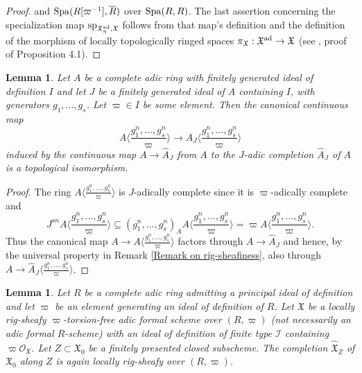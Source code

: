 \documentclass[12pt,twoside,a4paper]{article}
\newtheorem{lemma}[thm]{Lemma}
\theoremstyle{definition}
\theoremstyle{remark}
\newcommand\ad{{\rm ad}}
\newcommand\spc{{\rm sp}}
\newcommand\Spa{{\rm Spa}}
\begin{document}
\begin{proof}
and $\Spa(R[\varpi^{-1}], \overline{R})$ over $\Spa(R, R)$. The last assertion concerning the specialization map $\spc_{\mathfrak{X}_{\eta}^{\ad},\mathfrak{X}}$ follows from that map's definition and the definition of the morphism of locally topologically ringed spaces $\pi_{\mathfrak{X}}: \mathfrak{X}^{\ad}\to \mathfrak{X}$ (see \cite{Huber2}, proof of Proposition 4.1).\end{proof}
\begin{lemma}\label{Completion along an ideal}Let $A$ be a complete adic ring with finitely generated ideal of definition $I$ and let $J$ be a finitely generated ideal of $A$ containing $I$, with generators $g_1,\dots,g_s$. Let $\varpi\in I$ be some element. Then the canonical continuous map \begin{equation*}A\langle\frac{g_1^{n},\dots,g_s^{n}}{\varpi}\rangle\to \widehat{A}_{J}\langle\frac{g_1^{n},\dots,g_s^{n}}{\varpi}\rangle\end{equation*}induced by the continuous map $A\to \widehat{A}_{J}$ from $A$ to the $J$-adic completion $\widehat{A}_{J}$ of $A$ is a topological isomorphism.\end{lemma}
\begin{proof}The ring $A\langle\frac{g_1^{n},\dots,g_s^{n}}{\varpi}\rangle$ is $J$-adically complete since it is $\varpi$-adically complete and \begin{equation*}J^{sn}A\langle\frac{g_1^{n},\dots,g_s^{n}}{\varpi}\rangle\subseteq (g_1^{n},\dots,g_s^{n})_{A}A\langle\frac{g_1^{n},\dots,g_s^{n}}{\varpi}\rangle=\varpi A\langle\frac{g_1^{n},\dots,g_s^{n}}{\varpi}\rangle.\end{equation*}Thus the canonical map $A\to A\langle\frac{g_1^{n},\dots,g_s^{n}}{\varpi}\rangle$ factors through $A\to \widehat{A}_{J}$ and hence, by the universal property in Remark \ref{Remark on rig-sheafiness}, also through $A\to \widehat{A}_{J}\langle\frac{g_1^{n},\dots,g_s^{n}}{\varpi}\rangle$.\end{proof}
\begin{lemma}\label{Completion along a closed subscheme}Let $R$ be a complete adic ring admitting a principal ideal of definition and let $\varpi$ be an element generating an ideal of definition of $R$. Let $\mathfrak{X}$ be a locally rig-sheafy $\varpi$-torsion-free adic formal scheme over $(R, \varpi)$ (not necessarily an adic formal $R$-scheme) with an ideal of definition of finite type $\mathcal{I}$ containing $\varpi\mathcal{O}_{\mathfrak{X}}$. Let $Z\subset \mathfrak{X}_{0}$ be a finitely presented closed subscheme. The completion $\widehat{\mathfrak{X}}_{Z}$ of $\mathfrak{X}_{0}$ along $Z$ is again locally rig-sheafy over $(R, \varpi)$.\end{lemma}
\end{document}
